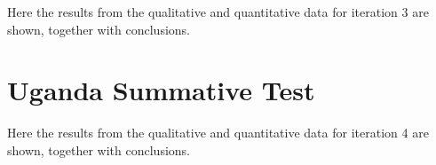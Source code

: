 Here the results from the qualitative and quantitative data for iteration 3 are shown, together with conclusions.





\section{Uganda Summative Test}

Here the results from the qualitative and quantitative data for iteration 4 are shown, together with conclusions.





%
%
%  
%  
%  
%  
%
%
%
%  
%  
%  
%  
%
%
%  
%  
%  
%  


%

